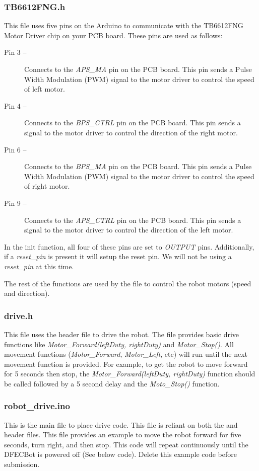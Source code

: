 \documentclass{handout}
\begin{document}
	\subsubsection{TB6612FNG.h}
	This file uses five pins on the Arduino to communicate with the TB6612FNG Motor Driver chip on your PCB board. These pins are used as follows:
	
	\begin{description}
		\item[Pin 3 --] Connects to the \textit{APS\_MA} pin on the PCB board. This pin sends a Pulse Width Modulation (PWM) signal to the motor driver to control the speed of left motor.
		\item[Pin 4 --] Connects to the \textit{BPS\_CTRL} pin on the PCB board. This pin sends a signal to the motor driver to control the direction of the right motor.
		\item[Pin 6 --] Connects to the \textit{BPS\_MA} pin on the PCB board. This pin sends a Pulse Width Modulation (PWM) signal to the motor driver to control the speed of right motor.
		\item[Pin 9 --] Connects to the \textit{APS\_CTRL} pin on the PCB board. This pin sends a signal to the motor driver to control the direction of the left motor.
	\end{description}
	
	In the init function, all four of these pins are set to \textit{OUTPUT} pins. Additionally, if a \textit{reset\_pin} is present it will setup the reset pin. We will not be using a \textit{reset\_pin} at this time.
	
	The rest of the functions are used by the  file to control the robot motors (speed and direction).
	
	\subsubsection{drive.h}
	This file uses the  header file to drive the robot. The  file provides basic drive functions like \textit{Motor\_Forward(leftDuty, rightDuty)} and \textit{Motor\_Stop()}. All movement functions (\textit{Motor\_Forward}, \textit{Motor\_Left}, etc) will run until the next movement function is provided. For example, to get the robot to move forward for 5 seconds then stop, the \textit{Motor\_Forward(leftDuty, rightDuty)} function should be called followed by a 5 second delay and the \textit{Moto\_Stop()} function.
	
	\subsubsection{robot\_drive.ino}
	This is the main file to place drive code. This file is reliant on both the  and  header files. This file provides an example to move the robot forward for five seconds, turn right, and then stop. This code will repeat continuously until the DFECBot is powered off (See below code). Delete this example code before submission.
	
\end{document}
